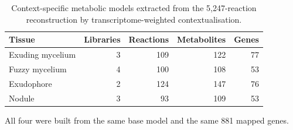 \begin{table}[htbp]
\caption{Context-specific metabolic models extracted from the 5,247-reaction reconstruction by transcriptome-weighted contextualisation.}\label{tab:models}
\footnotesize
\begin{tabular}{@{}lrrrr@{}}
\toprule
Tissue & Libraries & Reactions & Metabolites & Genes \\
\midrule
Exuding mycelium & 3 & 109 & 122 & 77 \\
Fuzzy mycelium & 4 & 100 & 108 & 53 \\
Exudophore & 2 & 124 & 147 & 76 \\
Nodule & 3 & 93 & 109 & 53 \\
\bottomrule
\end{tabular}
\begin{tablenotes}[flushleft]\footnotesize\item All four were built from the same base model and the same 881 mapped genes.\end{tablenotes}
\end{table}
